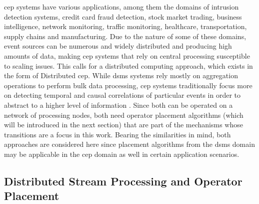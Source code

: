\gls{cep} systems have various applications, among them the  domains of intrusion detection systems, credit card fraud detection, stock market trading, business intelligence, network monitoring, traffic monitoring, healthcare, transportation, supply chains and manufacturing. Due to the nature of some of these domains, event sources can be numerous and widely distributed and producing high amounts of data, making \gls{cep} systems that rely on central processing susceptible to scaling issues. This calls for a distributed computing approach, which exists in the form of Distributed \gls{cep}.
While \gls{dsms} systems rely mostly on aggregation operations to perform bulk data processing, \gls{cep} systems traditionally focus more on detecting temporal and causal correlations of particular events in order to abstract to a higher level of information \cite{Cugola2012}. Since both can be operated on a network of processing nodes, both need operator placement algorithms (which will be introduced in the next section) that are part of the mechanisms whose transitions are a focus in this work. Bearing the similarities in mind, both approaches are considered here since placement algorithms from the \gls{dsms} domain may be applicable in the \gls{cep} domain as well in certain application scenarios.

\subsection{Distributed Stream Processing and Operator Placement}

